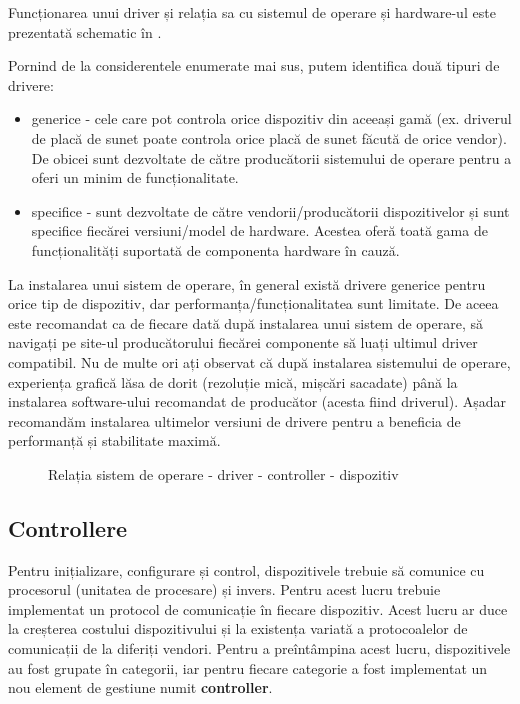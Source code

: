 Funcționarea unui driver și relația sa cu sistemul de operare și hardware-ul este prezentată schematic în .

Pornind de la considerentele enumerate mai sus, putem identifica două tipuri de drivere:

\begin{itemize}
	\item generice - cele care pot controla orice dispozitiv din aceeași
		gamă (ex. driverul de placă de sunet poate controla orice placă
		de sunet făcută de orice vendor). De obicei sunt dezvoltate de
		către producătorii sistemului de operare pentru a oferi un minim
		de funcționalitate.
	\item specifice - sunt dezvoltate de către vendorii/producătorii
		dispozitivelor și sunt specifice fiecărei versiuni/model de
		hardware. Acestea oferă toată gama de funcționalități suportată
		de componenta hardware în cauză.
\end{itemize}

La instalarea unui sistem de operare, în general există drivere generice pentru
orice tip de dispozitiv, dar performanța/funcționalitatea sunt limitate. De
aceea este recomandat ca de fiecare dată după instalarea unui sistem de operare,
să navigați pe site-ul producătorului fiecărei componente să luați ultimul
driver compatibil. Nu de multe ori ați observat că după instalarea sistemului de
operare, experiența grafică lăsa de dorit (rezoluție mică, mișcări sacadate)
până la instalarea software-ului recomandat de producător (acesta fiind
driverul). Așadar recomandăm instalarea ultimelor versiuni de drivere pentru
a beneficia de performanță și stabilitate maximă.

\begin{figure}[htbp]
	\centering
	\def\svgwidth{0.6\columnwidth}
	
	\caption{Relația sistem de operare - driver - controller - dispozitiv}
	\label{fig:hw:so-driver}
\end{figure}

\subsection{Controllere}
\label{sec:hw:os-interact:controller}

Pentru inițializare, configurare și control, dispozitivele trebuie să comunice
cu procesorul (unitatea de procesare) și invers. Pentru acest lucru trebuie
implementat un protocol de comunicație în fiecare dispozitiv. Acest lucru ar
duce la creșterea costului dispozitivului și la existența variată a
protocoalelor de comunicații de la diferiți vendori. Pentru a preîntâmpina acest
lucru, dispozitivele au fost grupate în categorii, iar pentru fiecare categorie
a fost implementat un nou element de gestiune numit \textbf{controller}.

